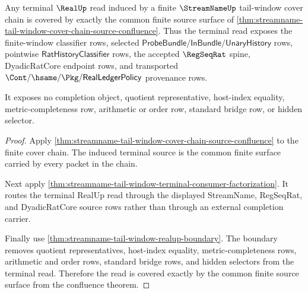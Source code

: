 \begin{theorem}
\label{thm:streamname-tail-window-terminal-coverage}
Any terminal $\RealUp$ read induced by a finite $\StreamNameUp$ tail-window
cover chain is covered by exactly the common finite source surface of
\autoref{thm:streamname-tail-window-cover-chain-source-confluence}. Thus the
terminal read exposes the finite-window classifier rows, selected
$\mathsf{ProbeBundle}/\mathsf{InBundle}/\mathsf{UnaryHistory}$ rows, pointwise
$\mathsf{RatHistoryClassifier}$ rows, the accepted $\RegSeqRat$ spine,
DyadicRatCore endpoint rows, and transported
$\Cont/\hsame/\Pkg/\mathsf{RealLedgerPolicy}$ provenance rows.

It exposes no completion object, quotient representative, host-index equality,
metric-completeness row, arithmetic or order row, standard bridge row, or hidden
selector.
\end{theorem}
\begin{proof}
Apply \autoref{thm:streamname-tail-window-cover-chain-source-confluence} to the
finite cover chain. The induced terminal source is the common finite surface
carried by every packet in the chain.

Next apply
\autoref{thm:streamname-tail-window-terminal-consumer-factorization}. It routes
the terminal RealUp read through the displayed StreamName, RegSeqRat, and
DyadicRatCore source rows rather than through an external completion carrier.

Finally use \autoref{thm:streamname-tail-window-realup-boundary}. The boundary
removes quotient representatives, host-index equality, metric-completeness
rows, arithmetic and order rows, standard bridge rows, and hidden selectors from
the terminal read. Therefore the read is covered exactly by the common finite
source surface from the confluence theorem.
\end{proof}
